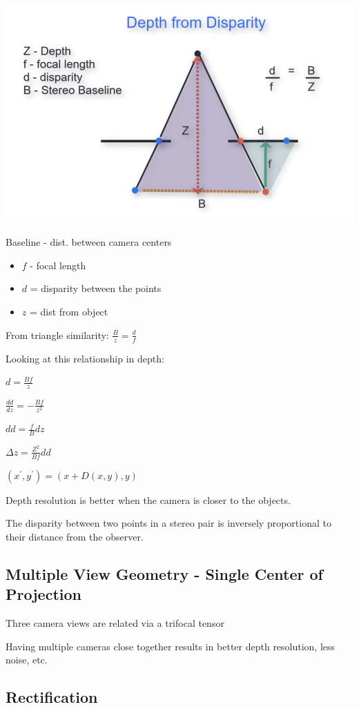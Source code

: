 \includegraphics[width=0.75\columnwidth]{cv_figures/disparity.png}

Baseline - dist. between camera centers
\begin{itemize}
\item $f$ - focal length
\item $d$ = disparity between the points
\item $z$ = dist from object
\end{itemize}

From triangle similarity: $\frac{B}{z} = \frac{d}{f}$

Looking at this relationship in depth:

${d}=\frac{Bf}{z} $

$\frac{dd}{dz}=-\frac{Bf}{z^2}$

$dd = \frac{f}{B}dz$

$\Delta z = \frac{Z^2}{Bf}dd$

$(x^\prime,y^\prime)=(x+D(x,y),y)$

Depth resolution is better when the camera is closer to the objects.

The disparity between two points in a stereo pair is inversely proportional to their distance from the observer.

\subsection{Multiple View Geometry - Single Center of Projection}

Three camera views are related via a trifocal tensor 

Having multiple cameras close together results in better depth resolution, less noise, etc.

\subsection{Rectification}

